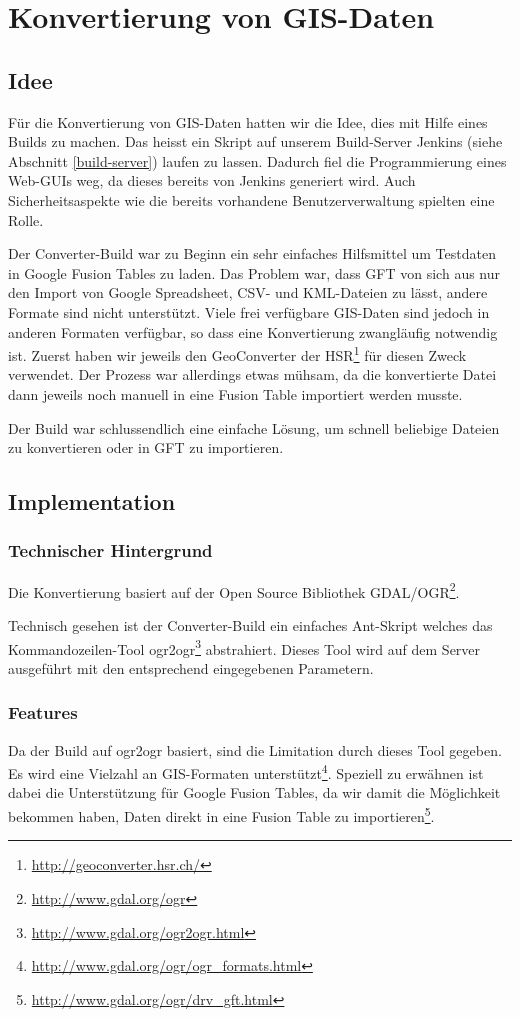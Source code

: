\chapter{Konvertierung von GIS-Daten}
\label{converter-build}

\section{Idee}
Für die Konvertierung von \gls{GIS}-Daten hatten wir die Idee, dies mit Hilfe eines Builds zu machen. Das heisst ein Skript auf unserem Build-Server Jenkins (siehe Abschnitt \ref{build-server}) laufen zu lassen. Dadurch fiel die Programmierung eines Web-GUIs weg, da dieses bereits von Jenkins generiert wird. Auch Sicherheitsaspekte wie die bereits vorhandene Benutzerverwaltung spielten eine Rolle.

Der Converter-Build war zu Beginn ein sehr einfaches Hilfsmittel um Testdaten in Google Fusion Tables zu laden. Das Problem war, dass GFT von sich aus nur den Import von Google Spreadsheet, \gls{CSV}- und \gls{KML}-Dateien zu lässt, andere Formate sind nicht unterstützt. Viele frei verfügbare \gls{GIS}-Daten sind jedoch in anderen Formaten verfügbar, so dass eine Konvertierung zwangläufig notwendig ist. Zuerst haben wir jeweils den GeoConverter der HSR\footnote{\url{http://geoconverter.hsr.ch/}} für diesen Zweck verwendet. Der Prozess war allerdings etwas mühsam, da die konvertierte Datei dann jeweils noch manuell in eine Fusion Table importiert werden musste.

Der Build war schlussendlich eine einfache Lösung, um schnell beliebige Dateien zu konvertieren oder in GFT zu importieren.

\section{Implementation}
\subsection{Technischer Hintergrund}
Die Konvertierung basiert auf der Open Source Bibliothek GDAL/OGR\footnote{\url{http://www.gdal.org/ogr}}.

Technisch gesehen ist der Converter-Build ein einfaches Ant-Skript welches das Kommandozeilen-Tool ogr2ogr\footnote{\url{http://www.gdal.org/ogr2ogr.html}} abstrahiert. Dieses Tool wird auf dem Server ausgeführt mit den entsprechend eingegebenen Parametern. 

\subsection{Features}
Da der Build auf ogr2ogr basiert, sind die Limitation durch dieses Tool gegeben. Es wird eine Vielzahl an \gls{GIS}-Formaten unterstützt\footnote{\url{http://www.gdal.org/ogr/ogr_formats.html}}. Speziell zu erwähnen ist dabei die Unterstützung für Google Fusion Tables, da wir damit die Möglichkeit bekommen haben, Daten direkt in eine Fusion Table zu importieren\footnote{\url{http://www.gdal.org/ogr/drv_gft.html}}.

